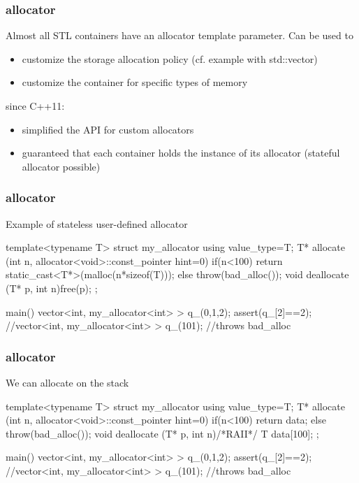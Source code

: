 \documentclass[aspectratio=43]{beamer}
\begin{document}
\begin{frame}[fragile]\frametitle{allocator}
  Almost all STL containers have an allocator template parameter.
  Can be used to
  \begin{itemize}
    \item customize the storage allocation policy (cf. example with std::vector)
    \item customize the container for specific types of memory
  \end{itemize}
  since C++11:
  \begin{itemize}
  \item simplified the API for custom allocators
  \item guaranteed that each container holds the instance of its allocator (\alert{stateful allocator possible})
  \end{itemize}
\end{frame}


\begin{frame}[fragile]\frametitle{allocator}
  Example of stateless user-defined allocator
  \begin{Cpplisting}{}
template<typename T>
struct my_allocator{
  using value_type=T;
  T* allocate (int n, allocator<void>::const_pointer hint=0){
    if(n<100)
      return static_cast<T*>(malloc(n*sizeof(T)));
    else throw(bad_alloc());
  }
  void deallocate (T* p, int n){free(p);}
};

main(){
  vector<int,  my_allocator<int> > q_({0,1,2});
  assert(q_[2]==2);
  //vector<int,  my_allocator<int> > q_(101); //throws bad_alloc
}
  \end{Cpplisting}
\end{frame}

\begin{frame}[fragile]\frametitle{allocator}
  We can allocate on the stack
  \begin{Cpplisting}{}
template<typename T>
struct my_allocator{
  using value_type=T;
  T* allocate (int n, allocator<void>::const_pointer hint=0){
    if(n<100)
      return data; else throw(bad_alloc());
  }
  void deallocate (T* p, int n){/*RAII*/}
  T data[100];
};

main(){
  vector<int,  my_allocator<int> > q_({0,1,2});
  assert(q_[2]==2);
  //vector<int,  my_allocator<int> > q_(101); //throws bad_alloc
}
  \end{Cpplisting}
\end{frame}
\end{document}
